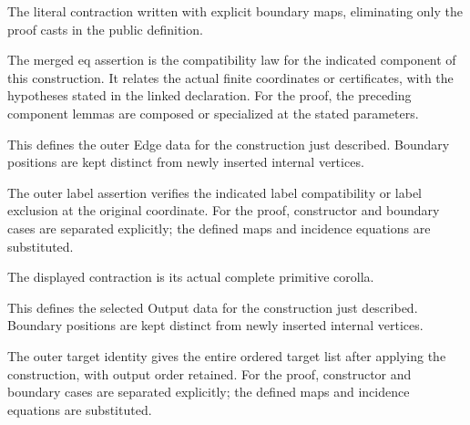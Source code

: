 The literal contraction written with explicit boundary maps, eliminating only the proof casts in the public definition.
\par{}

The merged eq assertion is the compatibility law for the indicated component of this construction. It relates the actual finite coordinates or certificates, with the hypotheses stated in the linked declaration.
For the proof, the preceding component lemmas are composed or specialized at the stated parameters.
\par{}

This defines the outer Edge data for the construction just described. Boundary positions are kept distinct from newly inserted internal vertices.
\par{}

The outer label assertion verifies the indicated label compatibility or label exclusion at the original coordinate.
For the proof, constructor and boundary cases are separated explicitly; the defined maps and incidence equations are substituted.
\par{}

The displayed contraction is its actual complete primitive corolla.
\par{}

This defines the selected Output data for the construction just described. Boundary positions are kept distinct from newly inserted internal vertices.
\par{}

The outer target identity gives the entire ordered target list after applying the construction, with output order retained.
For the proof, constructor and boundary cases are separated explicitly; the defined maps and incidence equations are substituted.
\par{}

